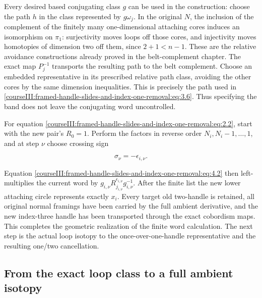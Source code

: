 Every desired based conjugating class \(g\) can be used in the construction: choose the path \(h\) in the class represented by \(g\omega_j\). In the original \(N\), the inclusion of the complement of the finitely many one-dimensional attaching cores induces an isomorphism on \(\pi_1\): surjectivity moves loops off those cores, and injectivity moves homotopies of dimension two off them, since \(2+1<n-1\). These are the relative avoidance constructions already proved in the belt-complement chapter. The exact map \(P_j^{-1}\) transports the resulting path to the belt complement. Choose an embedded representative in its prescribed relative path class, avoiding the other cores by the same dimension inequalities. This is precisely the path used in \eqref{courseIII:framed-handle-slides-and-index-one-removal:eq:3.6}. Thus specifying the band does not leave the conjugating word uncontrolled.

For equation \eqref{courseIII:framed-handle-slides-and-index-one-removal:eq:2.2}, start with the new pair's \(R_0=1\). Perform the factors in reverse order \(N_i,N_i-1,\ldots,1\), and at step \(\nu\) choose crossing sign

\begin{equation}
\sigma_\nu=-\epsilon_{i,\nu}.
 \label{courseIII:framed-handle-slides-and-index-one-removal:eq:4.4}
\end{equation}

Equation \eqref{courseIII:framed-handle-slides-and-index-one-removal:eq:4.2} then left-multiplies the current word by \(g_{i,\nu}R_{j_{i,\nu}}^{\epsilon_{i,\nu}}g_{i,\nu}^{-1}\). After the finite list the new lower attaching circle represents exactly \(x_i\). Every target old two-handle is retained, all original normal framings have been carried by the full ambient derivative, and the new index-three handle has been transported through the exact cobordism maps. This completes the geometric realization of the finite word calculation. The next step is the actual loop isotopy to the once-over-one-handle representative and the resulting one/two cancellation.

\subsection{From the exact loop class to a full ambient isotopy}
\label{courseIII:framed-handle-slides-and-index-one-removal:slide-loop-isotopy}

\label{courseIII:framed-handle-slides-and-index-one-removal:section-5}\label{courseIII:low-index-slides:5}

